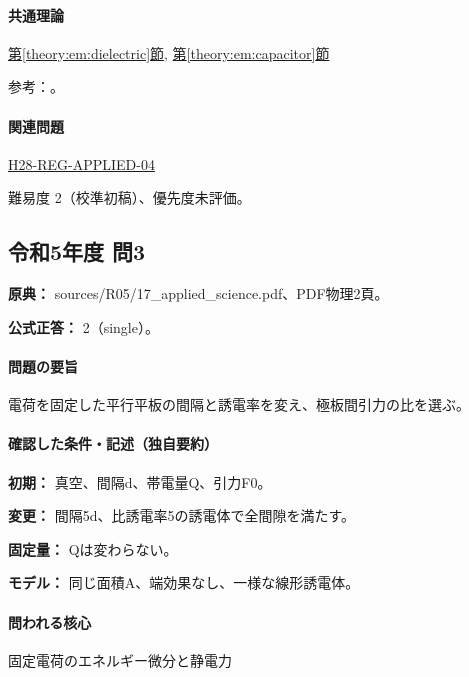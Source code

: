 \paragraph{共通理論} \hyperref[theory:em:dielectric]{第\ref*{theory:em:dielectric}節}, \hyperref[theory:em:capacitor]{第\ref*{theory:em:capacitor}節}

\par 参考：\cite{mit_em05,mit_ferroelectric}。

\paragraph{関連問題} \hyperref[q:h28-reg-applied-04]{H28-REG-APPLIED-04}

\par 難易度 2（校準初稿）、優先度未評価。

\subsection{令和5年度 問3}
\label{q:r05-reg-applied-03}

\noindent\textbf{原典：} sources/R05/17\_applied\_science.pdf、PDF物理2頁。

\textbf{公式正答：} 2（single）。

\paragraph{問題の要旨} 電荷を固定した平行平板の間隔と誘電率を変え、極板間引力の比を選ぶ。

\paragraph{確認した条件・記述（独自要約）}\mbox{}\par

\noindent\textbf{初期：} 真空、間隔d、帯電量Q、引力F0。\par

\noindent\textbf{変更：} 間隔5d、比誘電率5の誘電体で全間隙を満たす。\par

\noindent\textbf{固定量：} Qは変わらない。\par

\noindent\textbf{モデル：} 同じ面積A、端効果なし、一様な線形誘電体。\par

\paragraph{問われる核心} 固定電荷のエネルギー微分と静電力

